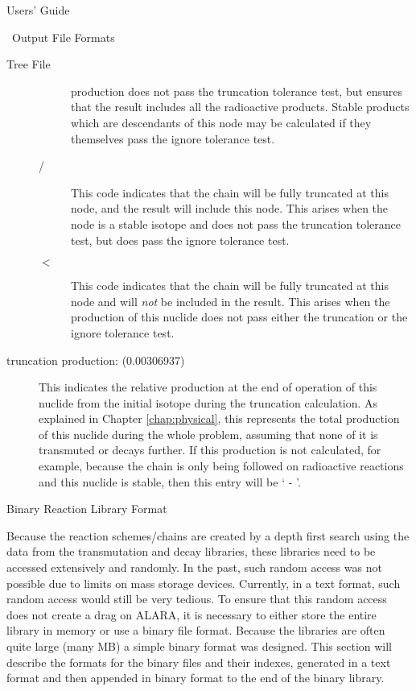 \begin{chapter}{Users' Guide\label{app:user.guide}}
\begin{section}{\ALARA\ Output File Formats\label{app:user.output}}
\begin{subsection}{Tree File\label{app:user.output.tree}}
\begin{description}
\begin{description}
          production does not pass the truncation tolerance test, but
          ensures that the result includes all the radioactive products.
          Stable products which are descendants of this node may be
          calculated if they themselves pass the ignore tolerance test.
        \item[/] This code indicates that the chain will be fully
          truncated at this node, and the result will include this
          node.  This arises when the node is a stable isotope and
          does not pass the truncation tolerance test, but does pass
          the ignore tolerance test.
        \item[$<$] This code indicates that the chain will be fully
          truncated at this node and will \textsl{not} be included in
          the result.  This arises when the production of this nuclide
          does not pass either the truncation or the ignore tolerance
          test.
        \end{description}
      \item[truncation production: (0.00306937) ] This indicates the
        relative production at the end of operation of this nuclide
        from the initial isotope during the truncation calculation.
        As explained in Chapter \ref{chap:physical}, this represents
        the total production of this nuclide during the whole problem,
        assuming that none of it is transmuted or decays further.  If
        this production is not calculated, for example, because the
        chain is only being followed on radioactive reactions and this
        nuclide is stable, then this entry will be ` - '.
      \end{description}
      
    \end{subsection}
    
  \end{section}


  \begin{section}{Binary Reaction Library Format}\label{app:binary_data}
    
    Because the reaction schemes/chains are created by a depth first
    search using the data from the transmutation and decay libraries,
    these libraries need to be accessed extensively and randomly.  In
    the past, such random access was not possible due to limits on
    mass storage devices.  Currently, in a text format, such random
    access would still be very tedious.  To ensure that this random
    access does not create a drag on ALARA, it is necessary to either
    store the entire library in memory or use a binary file format.
    Because the libraries are often quite large (many MB) a simple
    binary format was designed.  This section will describe the
    formats for the binary files and their indexes, generated in a
    text format and then appended in binary format to the end of the
    binary library.
    

\end{section}
\end{chapter}

